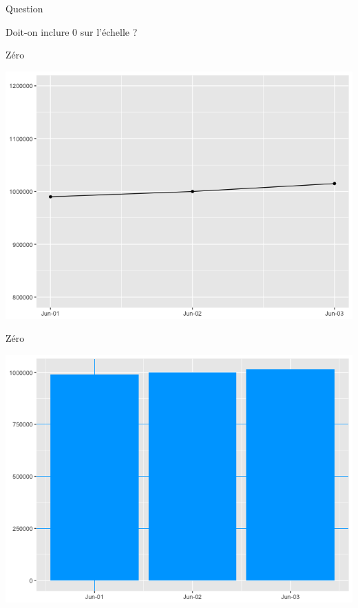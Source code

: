 \documentclass[french]{beamer}
\begin{document}
\begin{frame}{Question}
\begin{Large}
	Doit-on inclure 0 sur l'échelle ?
\end{Large}
\end{frame}

\begin{frame}{Zéro}
\begin{center}
	\includegraphics[height=0.8\textheight]{pente_flat}
\end{center}
\end{frame}

\begin{frame}{Zéro}
\begin{center}
	\includegraphics[height=0.8\textheight]{zero1}
\end{center}
\end{frame}
\end{document}
